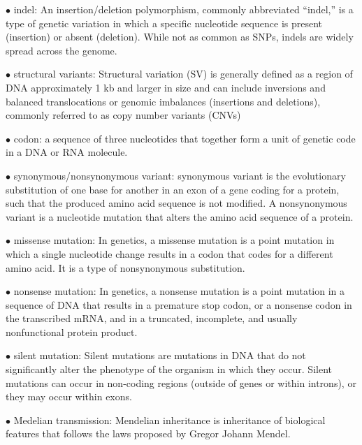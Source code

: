 \documentclass{article}
\begin{document}
\vspace{0.1in}
$\bullet$ indel:
An insertion/deletion polymorphism, commonly abbreviated “indel,” is a type of genetic variation in which a specific nucleotide sequence is present (insertion) or absent (deletion). While not as common as SNPs, indels are widely spread across the genome.

\vspace{0.1in}
$\bullet$ structural variants:
Structural variation (SV) is generally defined as a region of DNA approximately 1 kb and larger in size and can include inversions and balanced translocations or genomic imbalances (insertions and deletions), commonly referred to as copy number variants (CNVs)

\vspace{0.1in}
$\bullet$ codon:
a sequence of three nucleotides that together form a unit of genetic code in a DNA or RNA molecule.

\vspace{0.1in}
$\bullet$ synonymous/nonsynonymous variant:
synonymous variant is the evolutionary substitution of one base for another in an exon of a gene coding for a protein, such that the produced amino acid sequence is not modified.
A nonsynonymous variant is a nucleotide mutation that alters the amino acid sequence of a protein.

\vspace{0.1in}
$\bullet$ missense mutation:
In genetics, a missense mutation is a point mutation in which a single nucleotide change results in a codon that codes for a different amino acid. It is a type of nonsynonymous substitution.

\vspace{0.1in}
$\bullet$ nonsense mutation:
In genetics, a nonsense mutation is a point mutation in a sequence of DNA that results in a premature stop codon, or a nonsense codon in the transcribed mRNA, and in a truncated, incomplete, and usually nonfunctional protein product.

\vspace{0.1in}
$\bullet$ silent mutation:
Silent mutations are mutations in DNA that do not significantly alter the phenotype of the organism in which they occur. Silent mutations can occur in non-coding regions (outside of genes or within introns), or they may occur within exons.

\vspace{0.1in}
$\bullet$ Medelian transmission:
Mendelian inheritance is inheritance of biological features that follows the laws proposed by Gregor Johann Mendel.
\end{document}
